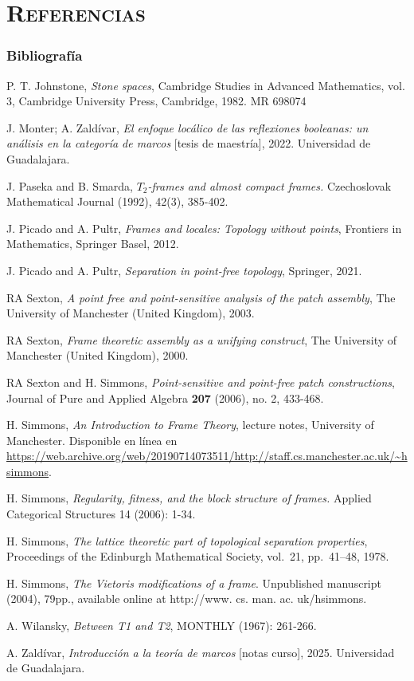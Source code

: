 \documentclass[compress,12pt]{beamer}
\begin{document}
\section*{\textsc{Referencias}}
\begin{frame}[allowframebreaks]
\frametitle{Bibliografía}
\begin{thebibliography}{20}

 P. T. Johnstone, \textit{Stone spaces}, Cambridge Studies in Advanced Mathematics, vol. 3, Cambridge University Press, Cambridge, 1982. MR 698074

 J. Monter; A. Zaldívar, \textit{El enfoque locálico de las reflexiones booleanas: un análisis en la categoría de marcos} [tesis de maestría], 2022. Universidad de Guadalajara.

 J. Paseka and B. Smarda, \textit{$ T_2 $-frames and almost compact frames.} Czechoslovak Mathematical Journal (1992), 42(3), 385-402.

 J. Picado and A. Pultr, \textit{Frames and locales: Topology without points}, Frontiers in Mathematics, Springer Basel, 2012.

 J. Picado and A. Pultr, \textit{Separation in point-free topology}, Springer, 2021.

 RA Sexton, \textit{A point free and point-sensitive analysis of the patch assembly}, The University of Manchester (United Kingdom), 2003.

 RA Sexton, \textit{Frame theoretic assembly as a unifying construct}, The University of Manchester (United Kingdom), 2000.

 RA Sexton and H. Simmons, \textit{Point-sensitive and point-free patch constructions}, Journal of Pure and Applied Algebra \textbf{207} (2006), no. 2, 433-468.

 H. Simmons, \textit{An Introduction to Frame Theory}, lecture notes, University of Manchester. Disponible en línea en \url{https://web.archive.org/web/20190714073511/http://staff.cs.manchester.ac.uk/~hsimmons}.

 H. Simmons, \textit{Regularity, fitness, and the block structure of frames.} Applied Categorical Structures 14 (2006): 1-34.

 H. Simmons, \textit{The lattice theoretic part of topological separation properties}, Proceedings of the Edinburgh Mathematical Society, vol.~21, pp.~41--48, 1978.

 H. Simmons, \textit{The Vietoris modifications of a frame}. Unpublished manuscript (2004), 79pp., available online at http://www. cs. man. ac. uk/hsimmons.

 A. Wilansky, \textit{Between T1 and T2}, MONTHLY (1967): 261-266.

 A. Zaldívar, \textit{Introducción a la teoría de marcos} [notas curso], 2025. Universidad de Guadalajara.
\end{thebibliography}
\end{frame}
\end{document}
